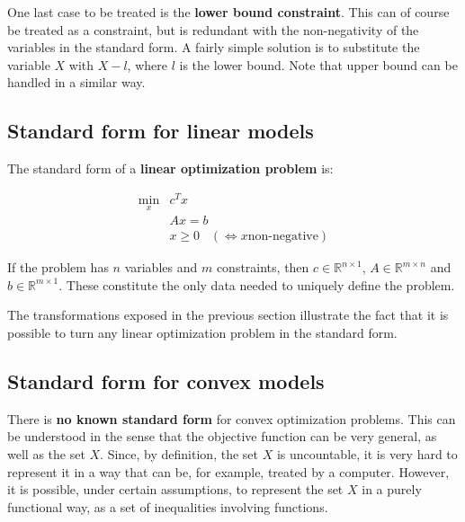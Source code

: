 One last case to be treated is the \textbf{lower bound constraint}. This can of course be treated as a constraint, but is redundant with the non-negativity of the variables in the standard form. A fairly simple solution is to substitute the variable $X$ with $X-l$, where $l$ is the lower bound. Note that upper bound can be handled in a similar way.

\begin{center}
\end{center}


\subsection{Standard form for linear models}
The standard form of a \textbf{linear optimization problem} is:
\begin{framed}
$$\begin{array}{cl}
\min_x & c^T x \\
 & A x = b \\
 & x \geq 0 \;\;\; (\Longleftrightarrow x \text{non-negative})
\end{array}$$
\end{framed}

If the problem has $n$ variables and $m$ constraints, then $c \in \mathbb{R}^{n\times 1}$, $A \in \mathbb{R}^{m\times n}$ and $b \in \mathbb{R}^{m\times 1}$. These constitute the only data needed to uniquely define the problem. 

The transformations exposed in the previous section illustrate the fact that it is possible to turn any linear optimization problem in the standard form.

\subsection{Standard form for convex models}
There is \textbf{no known standard form} for convex optimization problems. This can be understood in the sense that the objective function can be very general, as well as the set $X$. Since, by definition, the set $X$ is uncountable, it is very hard to represent it in a way that can be, for example, treated by a computer. However, it is possible, under certain assumptions, to represent the set $X$ in a purely functional way, as a set of inequalities involving functions.

